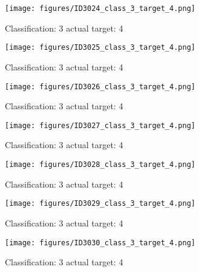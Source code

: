 \begin{figure}[h!]
\begin{center}
\texttt{[image: figures/ID3024\_class\_3\_target\_4.png]}
\end{center}
\caption{ Classification: 3 actual target: 4}
\label{fig:ID3024_class_3_target_4}
\end{figure}
\begin{figure}[h!]
\begin{center}
\texttt{[image: figures/ID3025\_class\_3\_target\_4.png]}
\end{center}
\caption{ Classification: 3 actual target: 4}
\label{fig:ID3025_class_3_target_4}
\end{figure}
\begin{figure}[h!]
\begin{center}
\texttt{[image: figures/ID3026\_class\_3\_target\_4.png]}
\end{center}
\caption{ Classification: 3 actual target: 4}
\label{fig:ID3026_class_3_target_4}
\end{figure}
\begin{figure}[h!]
\begin{center}
\texttt{[image: figures/ID3027\_class\_3\_target\_4.png]}
\end{center}
\caption{ Classification: 3 actual target: 4}
\label{fig:ID3027_class_3_target_4}
\end{figure}
\begin{figure}[h!]
\begin{center}
\texttt{[image: figures/ID3028\_class\_3\_target\_4.png]}
\end{center}
\caption{ Classification: 3 actual target: 4}
\label{fig:ID3028_class_3_target_4}
\end{figure}
\begin{figure}[h!]
\begin{center}
\texttt{[image: figures/ID3029\_class\_3\_target\_4.png]}
\end{center}
\caption{ Classification: 3 actual target: 4}
\label{fig:ID3029_class_3_target_4}
\end{figure}
\begin{figure}[h!]
\begin{center}
\texttt{[image: figures/ID3030\_class\_3\_target\_4.png]}
\end{center}
\caption{ Classification: 3 actual target: 4}
\label{fig:ID3030_class_3_target_4}
\end{figure}
